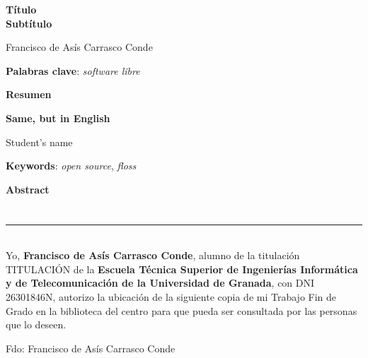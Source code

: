 \thispagestyle{empty}

\begin{center}
{\large\bfseries Título \\ Subtítulo }\\
\end{center}
\begin{center}
Francisco de Asís Carrasco Conde\\
\end{center}


\vspace{0.5cm}
\noindent\textbf{Palabras clave}: \textit{software libre}
\vspace{0.7cm}

\noindent\textbf{Resumen}\\  
	

\cleardoublepage

\begin{center}
	{\large\bfseries Same, but in English}\\
\end{center}
\begin{center}
	Student's name\\
\end{center}
\vspace{0.5cm}
\noindent\textbf{Keywords}: \textit{open source}, \textit{floss}
\vspace{0.7cm}

\noindent\textbf{Abstract}\\


\chapter*{}
\thispagestyle{empty}

\noindent\rule[-1ex]{\textwidth}{2pt}\\[4.5ex]

Yo, \textbf{Francisco de Asís Carrasco Conde}, alumno de la titulación TITULACIÓN de la \textbf{Escuela Técnica Superior
de Ingenierías Informática y de Telecomunicación de la Universidad de Granada}, con DNI 26301846N, autorizo la
ubicación de la siguiente copia de mi Trabajo Fin de Grado en la biblioteca del centro para que pueda ser
consultada por las personas que lo deseen.

\vspace{6cm}

\noindent Fdo: Francisco de Asís Carrasco Conde

